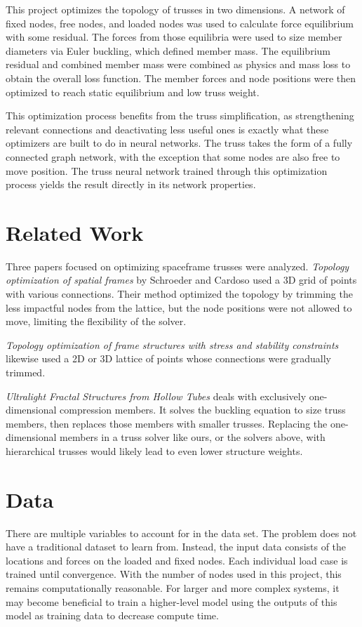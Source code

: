 \documentclass[11pt]{article}
\begin{document}
This project optimizes the topology of trusses in two dimensions. A network of fixed nodes, free nodes, and loaded nodes was used to calculate force equilibrium with some residual. The forces from those equilibria were used to size member diameters via Euler buckling, which defined member mass. The equilibrium residual and combined member mass were combined as physics and mass loss to obtain the overall loss function. The member forces and node positions were then optimized to reach static equilibrium and low truss weight.

This optimization process benefits from the truss simplification, as strengthening relevant connections and deactivating less useful ones is exactly what these optimizers are built to do in neural networks. The truss takes the form of a fully connected graph network, with the exception that some nodes are also free to move position. The truss neural network trained through this optimization process yields the result directly in its network properties.

\section{Related Work}

Three papers focused on optimizing spaceframe trusses were analyzed. \emph{Topology optimization of spatial frames} by Schroeder and Cardoso used a 3D grid of points with various connections. Their method optimized the topology by trimming the less impactful nodes from the lattice, but the node positions were not allowed to move, limiting the flexibility of the solver.

\emph{Topology optimization of frame structures with stress and stability constraints} likewise used a 2D or 3D lattice of points whose connections were gradually trimmed.

\emph{Ultralight Fractal Structures from Hollow Tubes} deals with exclusively one-dimensional compression members. It solves the buckling equation to size truss members, then replaces those members with smaller trusses. Replacing the one-dimensional members in a truss solver like ours, or the solvers above, with hierarchical trusses would likely lead to even lower structure weights.

\section{Data}

There are multiple variables to account for in the data set. The problem does not have a traditional dataset to learn from. Instead, the input data consists of the locations and forces on the loaded and fixed nodes. Each individual load case is trained until convergence. With the number of nodes used in this project, this remains computationally reasonable. For larger and more complex systems, it may become beneficial to train a higher-level model using the outputs of this model as training data to decrease compute time.
\end{document}
